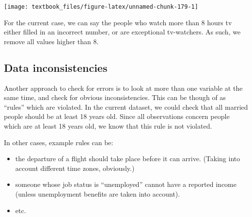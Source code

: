 \documentclass[]{tufte-book}
\newenvironment{Shaded}{}{}
\newcommand{\DataTypeTok}[1]{\textcolor[rgb]{0.56,0.13,0.00}{#1}}
\newcommand{\DecValTok}[1]{\textcolor[rgb]{0.25,0.63,0.44}{#1}}
\newcommand{\KeywordTok}[1]{\textcolor[rgb]{0.00,0.44,0.13}{\textbf{#1}}}
\newcommand{\NormalTok}[1]{#1}
\newcommand{\OperatorTok}[1]{\textcolor[rgb]{0.40,0.40,0.40}{#1}}
\newcommand{\OtherTok}[1]{\textcolor[rgb]{0.00,0.44,0.13}{#1}}
\newcommand{\StringTok}[1]{\textcolor[rgb]{0.25,0.44,0.63}{#1}}
\providecommand{\tightlist}{%
  \setlength{\itemsep}{0pt}\setlength{\parskip}{0pt}}
\begin{document}
\begin{Shaded}
\end{Shaded}

\texttt{[image: textbook\_files/figure-latex/unnamed-chunk-179-1]}

For the current case, we can say the people who watch more than 8 hours tv either filled in an incorrect number, or are exceptional tv-watchers. As such, we remove all values higher than 8.

\begin{Shaded}
\end{Shaded}

\hypertarget{data-inconsistencies}{%
\subsection{Data inconsistencies}\label{data-inconsistencies}}

Another approach to check for errors is to look at more than one variable at the same time, and check for obvious inconsistencies. This can be though of as ``rules'' which are violated. In the current dataset, we could check that all married people should be at least 18 years old. Since all observations concern people which are at least 18 years old, we know that this rule is not violated.

In other cases, example rules can be:

\begin{itemize}
\tightlist
\item
  the departure of a flight should take place before it can arrive. (Taking into account different time zones, obviously.)
\item
  someone whose job status is ``unemployed'' cannot have a reported income (unless unemployment benefits are taken into account).
\item
  etc.
\end{itemize}
\end{document}
